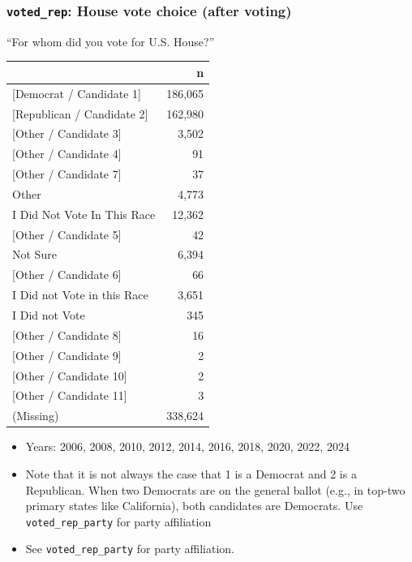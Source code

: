 \documentclass[10pt,article,oneside]{memoir}
\begin{document}
\subsubsection{\texorpdfstring{\texttt{voted\_rep}: House vote choice
(after
voting)}{voted\_rep: House vote choice (after voting)}}\label{voted_rep-house-vote-choice-after-voting}

``For whom did you vote for U.S. House?''

\begin{table}[H]
\centering
\begin{tabular}[t]{lr}
\toprule
 & n\\
\midrule
{}{[Democrat / Candidate 1]} & 186,065\\
{}{[Republican / Candidate 2]} & 162,980\\
{}{[Other / Candidate 3]} & 3,502\\
{}{[Other / Candidate 4]} & 91\\
{}{[Other / Candidate 7]} & 37\\
Other & 4,773\\
I Did Not Vote In This Race & 12,362\\
{}{[Other / Candidate 5]} & 42\\
Not Sure & 6,394\\
{}{[Other / Candidate 6]} & 66\\
I Did not Vote in this Race & 3,651\\
I Did not Vote & 345\\
{}{[Other / Candidate 8]} & 16\\
{}{[Other / Candidate 9]} & 2\\
{}{[Other / Candidate 10]} & 2\\
{}{[Other / Candidate 11]} & 3\\
(Missing) & 338,624\\
\bottomrule
\end{tabular}
\end{table}

\begin{itemize}
\tightlist
\item
  Years: 2006, 2008, 2010, 2012, 2014, 2016, 2018, 2020, 2022, 2024
\item
  Note that it is not always the case that 1 is a Democrat and 2 is a
  Republican. When two Democrats are on the general ballot (e.g., in
  top-two primary states like California), both candidates are
  Democrats. Use \texttt{voted\_rep\_party} for party affiliation
\item
  See \texttt{voted\_rep\_party} for party affiliation.
\end{itemize}
\end{document}
